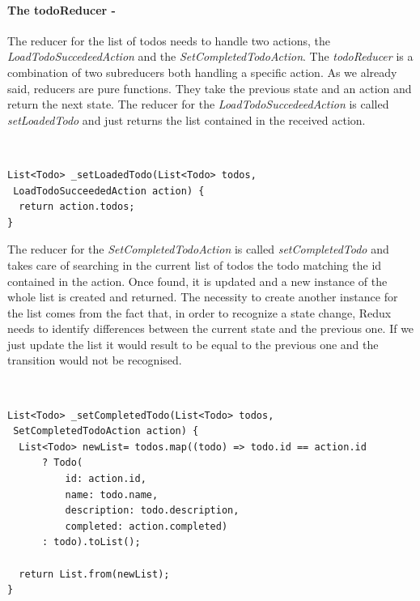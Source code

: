 \paragraph{The todoReducer - }
\label{subpar:todo_app_bloc_core_state}
The reducer for the list of todos needs to handle two actions, the \textit{LoadTodoSuccedeedAction} and the \textit{SetCompletedTodoAction}. The \textit{todoReducer} is a combination of two subreducers both handling a specific action. As we already said, reducers are pure functions. They take the previous state and an action and return the next state. The reducer for the \textit{LoadTodoSuccedeedAction} is called \textit{setLoadedTodo} and just returns the list contained in the received action.
\begin{code}
\mbox{}\\
 \mbox{}
		\label{code:2.14}
\begin{verbatim}
List<Todo> _setLoadedTodo(List<Todo> todos,
 LoadTodoSucceededAction action) {
  return action.todos;
}
\end{verbatim}
\end{code}
The reducer for the \textit{SetCompletedTodoAction} is called \textit{setCompletedTodo} and takes care of searching in the current list of todos the todo matching the id contained in the action. Once found, it is updated and a new instance of the whole list is created and returned. The necessity to create another instance for the list comes from the fact that, in order to recognize a state change, Redux needs to identify differences between the current state and the previous one. If we just update the list it would result to be equal to the previous one and the transition would not be recognised.
\begin{code}
\mbox{}\\
 \mbox{}
		\label{code:2.14}
\begin{verbatim}
List<Todo> _setCompletedTodo(List<Todo> todos,
 SetCompletedTodoAction action) {
  List<Todo> newList= todos.map((todo) => todo.id == action.id
      ? Todo(
          id: action.id,
          name: todo.name,
          description: todo.description,
          completed: action.completed)
      : todo).toList();

  return List.from(newList);
}
\end{verbatim}
\mbox{}
\end{code}

